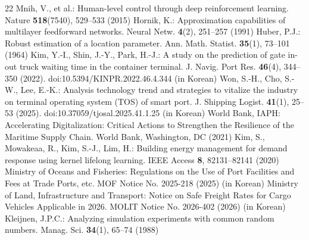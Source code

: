 \documentclass[a4paper]{llncs}
\begin{document}
\begin{thebibliography}{22}
 Mnih, V., et al.: Human-level control through deep reinforcement learning. Nature \textbf{518}(7540), 529--533 (2015)
 Hornik, K.: Approximation capabilities of multilayer feedforward networks. Neural Netw. \textbf{4}(2), 251--257 (1991)
 Huber, P.J.: Robust estimation of a location parameter. Ann. Math. Statist. \textbf{35}(1), 73--101 (1964)
 Kim, Y.-I., Shin, J.-Y., Park, H.-J.: A study on the prediction of gate in-out truck waiting time in the container terminal. J. Navig. Port Res. \textbf{46}(4), 344--350 (2022). doi:10.5394/KINPR.2022.46.4.344 (in Korean)
 Won, S.-H., Cho, S.-W., Lee, E.-K.: Analysis technology trend and strategies to vitalize the industry on terminal operating system (TOS) of smart port. J. Shipping Logist. \textbf{41}(1), 25--53 (2025). doi:10.37059/tjosal.2025.41.1.25 (in Korean)
 World Bank, IAPH: Accelerating Digitalization: Critical Actions to Strengthen the Resilience of the Maritime Supply Chain. World Bank, Washington, DC (2021)
 Kim, S., Mowakeaa, R., Kim, S.-J., Lim, H.: Building energy management for demand response using kernel lifelong learning. IEEE Access \textbf{8}, 82131--82141 (2020)
 Ministry of Oceans and Fisheries: Regulations on the Use of Port Facilities and Fees at Trade Ports, etc. MOF Notice No. 2025-218 (2025) (in Korean)
 Ministry of Land, Infrastructure and Transport: Notice on Safe Freight Rates for Cargo Vehicles Applicable in 2026. MOLIT Notice No. 2026-402 (2026) (in Korean)
 Kleijnen, J.P.C.: Analyzing simulation experiments with common random numbers. Manag. Sci. \textbf{34}(1), 65--74 (1988)
\end{thebibliography}
\end{document}
